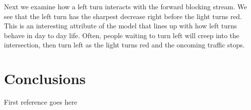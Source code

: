 \documentclass[12pt]{article}
\begin{document}
Next we examine how a left turn interacts with the forward blocking stream. We see that the left turn has the sharpest decrease right before the light turns red. This is an interesting attribute of the model that lines up with how left turns behave in day to day life. Often, people waiting to turn left will creep into the intersection, then turn left as the light turns red and the oncoming traffic stops.\\

\section{Conclusions}

\begin{thebibliography}{99}
 First reference goes here
\end{thebibliography}
\end{document}
